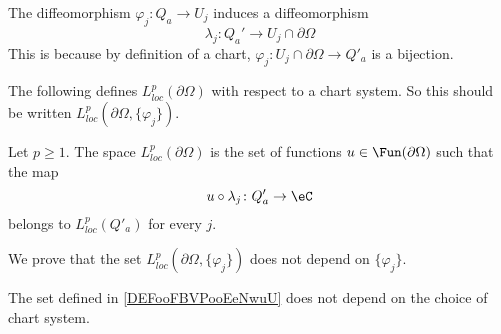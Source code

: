 The diffeomorphism \( \varphi_j\colon Q_a\to U_j\) induces a diffeomorphism 
\begin{equation}
 \lambda_j\colon Q_a'\to U_j\cap\partial \Omega
\end{equation}
This is because by definition of a chart, \( \varphi_j\colon U_j\cap\partial\Omega\to Q'_a\) is a bijection.

The following defines \( L^p_{loc}(\partial\Omega)\) with respect to a chart system. So this should be written \( L^p_{loc}(\partial\Omega,\{ \varphi_j \})\). 
\begin{definition}      \label{DEFooFBVPooEeNwuU}
    Let \( p\geq 1\). The space \( L^p_{loc}(\partial \Omega)\) is the set of functions \( u\in\Fun(\partial\Omega)\) such that the map
    \begin{equation}
        u\circ\lambda_j\colon Q'_a\to \eC
    \end{equation}
    belongs to \( L^p_{loc}(Q'_a)\) for every \( j\).
\end{definition}

We prove that the set \( L^p_{loc}(\partial\Omega,\{ \varphi_j \})\) does not depend on \( \{ \varphi_j \}\).
\begin{lemma}
    The set defined in \ref{DEFooFBVPooEeNwuU} does not depend on the choice of chart system.
\end{lemma}

